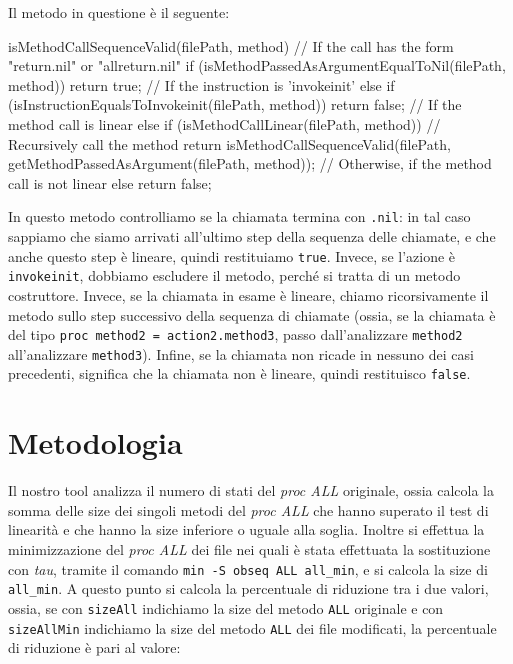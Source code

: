 Il metodo in questione è il seguente:

\begin{myalgorithm}[caption={Pseudocodice metodo isMethodCallSequenceValid()}, label={cod:pseudocodice-metodo-isMethodCallSequenceValid}]
isMethodCallSequenceValid(filePath, method) {
  // If the call has the form "return.nil" or "allreturn.nil"
  if (isMethodPassedAsArgumentEqualToNil(filePath, method)) {
    return true;
  }
  // If the instruction is 'invokeinit'
  else if (isInstructionEqualsToInvokeinit(filePath, method)) {
    return false;
  }
  // If the method call is linear
  else if (isMethodCallLinear(filePath, method)) {
    // Recursively call the method
    return isMethodCallSequenceValid(filePath, getMethodPassedAsArgument(filePath, method));
  }
  // Otherwise, if the method call is not linear
  else {
    return false;
  }
}
\end{myalgorithm}

In questo metodo controlliamo se la chiamata termina con \verb|.nil|: in tal caso sappiamo che siamo arrivati all'ultimo step della sequenza delle chiamate, e che anche questo step è lineare, quindi restituiamo \verb|true|. Invece, se l'azione è \verb|invokeinit|, dobbiamo escludere il metodo, perché si tratta di un metodo costruttore. Invece, se la chiamata in esame è lineare, chiamo ricorsivamente il metodo sullo step successivo della sequenza di chiamate (ossia, se la chiamata è del tipo \verb|proc method2 = action2.method3|, passo dall'analizzare \verb|method2| all'analizzare \verb|method3|). Infine, se la chiamata non ricade in nessuno dei casi precedenti, significa che la chiamata non è lineare, quindi restituisco \verb|false|.

\section{Metodologia}

Il nostro tool analizza il numero di stati del \textit{proc ALL} originale, ossia calcola la somma delle size dei singoli metodi del \textit{proc ALL} che hanno superato il test di linearità e che hanno la size inferiore o uguale alla soglia. Inoltre si effettua la minimizzazione del \textit{proc ALL} dei file nei quali è stata effettuata la sostituzione con \textit{tau}, tramite il comando \verb|min -S obseq ALL all_min|, e si calcola la size di \verb|all_min|. A questo punto si calcola la percentuale di riduzione tra i due valori, ossia, se con \verb|sizeAll| indichiamo la size del metodo \verb|ALL| originale e con \verb|sizeAllMin| indichiamo la size del metodo \verb|ALL| dei file modificati, la percentuale di riduzione è pari al valore:

